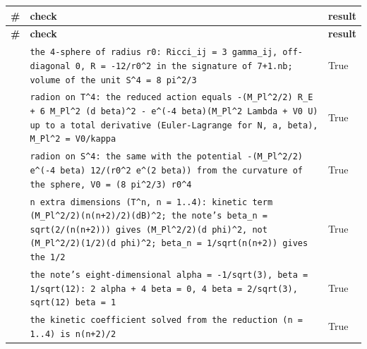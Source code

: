 \documentclass[10pt,a4paper]{article}
\begin{document}
{\footnotesize
\begin{longtable}{>{\raggedright\arraybackslash}p{}>{\raggedright\arraybackslash}p{}>{\raggedright\arraybackslash}p{}}
\toprule
\textbf{\#} & \textbf{check} & \textbf{result} \\
\midrule\endfirsthead
\toprule
\textbf{\#} & \textbf{check} & \textbf{result} \\
\midrule\endhead
\endfoot
\bottomrule\endlastfoot
1 & \texttt{the 4-sphere of radius r0: Ricci\_\allowbreak{}ij = 3 gamma\_\allowbreak{}ij, off-diagonal 0, R = -12/\allowbreak{}r0\textasciicircum{}2 in the signature of 7+1.nb; volume of the unit S\textasciicircum{}4 = 8 pi\textasciicircum{}2/\allowbreak{}3} & True \\
2 & \texttt{radion on T\textasciicircum{}4: the reduced action equals -(M\_\allowbreak{}Pl\textasciicircum{}2/\allowbreak{}2) R\_\allowbreak{}E + 6 M\_\allowbreak{}Pl\textasciicircum{}2 (d beta)\textasciicircum{}2 - e\textasciicircum{}(-4 beta)(M\_\allowbreak{}Pl\textasciicircum{}2 Lambda + V0 U) up to a total derivative (Euler-Lagrange for N, a, beta), M\_\allowbreak{}Pl\textasciicircum{}2 = V0/\allowbreak{}kappa} & True \\
3 & \texttt{radion on S\textasciicircum{}4: the same with the potential -(M\_\allowbreak{}Pl\textasciicircum{}2/\allowbreak{}2) e\textasciicircum{}(-4 beta) 12/\allowbreak{}(r0\textasciicircum{}2 e\textasciicircum{}(2 beta)) from the curvature of the sphere, V0 = (8 pi\textasciicircum{}2/\allowbreak{}3) r0\textasciicircum{}4} & True \\
4 & \texttt{n extra dimensions (T\textasciicircum{}n, n = 1..4): kinetic term (M\_\allowbreak{}Pl\textasciicircum{}2/\allowbreak{}2)(n(n+2)/\allowbreak{}2)(dB)\textasciicircum{}2; the note's beta\_\allowbreak{}n = sqrt(2/\allowbreak{}(n(n+2))) gives (M\_\allowbreak{}Pl\textasciicircum{}2/\allowbreak{}2)(d phi)\textasciicircum{}2, not (M\_\allowbreak{}Pl\textasciicircum{}2/\allowbreak{}2)(1/\allowbreak{}2)(d phi)\textasciicircum{}2; beta\_\allowbreak{}n = 1/\allowbreak{}sqrt(n(n+2)) gives the 1/\allowbreak{}2} & True \\
5 & \texttt{the note's eight-dimensional alpha = -1/\allowbreak{}sqrt(3), beta = 1/\allowbreak{}sqrt(12): 2 alpha + 4 beta = 0, 4 beta = 2/\allowbreak{}sqrt(3), sqrt(12) beta = 1} & True \\
6 & \texttt{the kinetic coefficient solved from the reduction (n = 1..4) is n(n+2)/\allowbreak{}2} & True \\

\end{longtable}}
\end{document}
